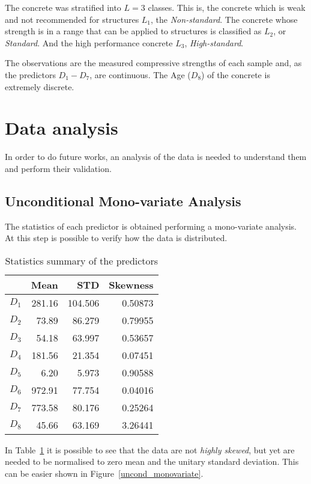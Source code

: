 \documentclass[conference]{IEEEtran}
\begin{document}
The concrete was stratified into $L=3$ classes\cite{b1}. This is, the concrete which is weak and not recommended for structures $L_1$, the \emph{Non-standard}. The concrete whose strength is in a range that can be applied to structures is classified as $L_2$, or \emph{Standard}. And the high performance concrete $L_3$, \emph{High-standard}.

The observations are the measured compressive strengths of each sample and, as the predictors $D_1 - D_7$, are continuous. The Age ($D_8$) of the concrete is extremely discrete.

\section{Data analysis}\label{data_analysis}

In order to do future works, an analysis of the data is needed to understand them and perform their validation.

\subsection{Unconditional Mono-variate Analysis}

The statistics of each predictor is obtained performing a mono-variate analysis. At this step is possible to verify how the data is distributed.

\begin{table}[htp]
\caption{Statistics summary of the predictors}
  \centering
  \begin{tabular}{@{} crrr @{}}
    \toprule
     & Mean & STD & Skewness \\ 
    \midrule
    $D_1$ & 281.16 & 104.506 & 0.50873 \\ 
    $D_2$ & 73.89 & 86.279 & 0.79955 \\ 
    $D_3$ & 54.18 & 63.997 & 0.53657 \\ 
    $D_4$ & 181.56 & 21.354 & 0.07451 \\ 
    $D_5$ & 6.20 & 5.973 & 0.90588 \\ 
    $D_6$ & 972.91 & 77.754 & 0.04016 \\ 
    $D_7$ & 773.58 & 80.176 & 0.25264 \\ 
    $D_8$ & 45.66 & 63.169 & 3.26441 \\       
    \bottomrule
  \end{tabular}
\label{statistics_table_alldataset}
\end{table}%

In Table~\ref{statistics_table_alldataset} it is possible to see that the data are not \emph{highly skewed}, but yet are needed to be normalised to zero mean and the unitary standard deviation. This can be easier shown in Figure~\ref{uncond_monovariate}.
\end{document}
